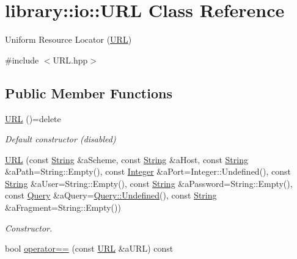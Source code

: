 \hypertarget{classlibrary_1_1io_1_1_u_r_l}{}\section{library\+:\+:io\+:\+:U\+RL Class Reference}
\label{classlibrary_1_1io_1_1_u_r_l}


Uniform Resource Locator (\hyperlink{classlibrary_1_1io_1_1_u_r_l}{U\+RL})  




{\ttfamily \#include $<$U\+R\+L.\+hpp$>$}

\subsection*{Public Member Functions}
\begin{DoxyCompactItemize}
\item 
\hyperlink{classlibrary_1_1io_1_1_u_r_l_a7e9c070138a6dbd000ffb10b7cd8a5c4}{U\+RL} ()=delete
\begin{DoxyCompactList}\small\item\em Default constructor (disabled) \end{DoxyCompactList}\item 
\hyperlink{classlibrary_1_1io_1_1_u_r_l_a9ea51e79794584e9feb34a679913b091}{U\+RL} (const \hyperlink{namespacelibrary_1_1io_a7469b45835a4421045db344d6a5a1f85}{String} \&a\+Scheme, const \hyperlink{namespacelibrary_1_1io_a7469b45835a4421045db344d6a5a1f85}{String} \&a\+Host, const \hyperlink{namespacelibrary_1_1io_a7469b45835a4421045db344d6a5a1f85}{String} \&a\+Path=String\+::\+Empty(), const \hyperlink{namespacelibrary_1_1io_a0a929bf9e177597c2e92073d200dda53}{Integer} \&a\+Port=Integer\+::\+Undefined(), const \hyperlink{namespacelibrary_1_1io_a7469b45835a4421045db344d6a5a1f85}{String} \&a\+User=String\+::\+Empty(), const \hyperlink{namespacelibrary_1_1io_a7469b45835a4421045db344d6a5a1f85}{String} \&a\+Password=String\+::\+Empty(), const \hyperlink{namespacelibrary_1_1io_a39ebaf2265de78ba79eb5347f2af61b3}{Query} \&a\+Query=\hyperlink{classlibrary_1_1io_1_1url_1_1_query_acea48a0bfba96773f6db11d1a904a520}{Query\+::\+Undefined}(), const \hyperlink{namespacelibrary_1_1io_a7469b45835a4421045db344d6a5a1f85}{String} \&a\+Fragment=String\+::\+Empty())
\begin{DoxyCompactList}\small\item\em Constructor. \end{DoxyCompactList}\item 
bool \hyperlink{classlibrary_1_1io_1_1_u_r_l_a4a3011126a94a48d022edda036560be1}{operator==} (const \hyperlink{classlibrary_1_1io_1_1_u_r_l}{U\+RL} \&a\+U\+RL) const

\end{DoxyCompactItemize}
